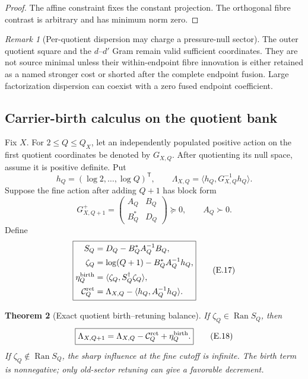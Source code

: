 \documentclass[11pt]{article}
\newtheorem{theorem}{Theorem}[section]
\theoremstyle{definition}
\theoremstyle{remark}
\newtheorem{remark}[theorem]{Remark}
\newcommand{\Ran}{\operatorname{Ran}}
\begin{document}
\begin{proof}
The affine constraint fixes the constant projection.  The orthogonal fibre
contrast is arbitrary and has minimum norm zero.
\end{proof}

\begin{remark}[Per-quotient dispersion may charge a pressure-null sector]
The outer quotient square and the $d$--$d'$ Gram remain valid sufficient
coordinates.  They are not source minimal unless their within-endpoint fibre
innovation is either retained as a named stronger cost or shorted after the
complete endpoint fusion.  Large factorization dispersion can coexist with a
zero fused endpoint coefficient.
\end{remark}

\subsection{Carrier-birth calculus on the quotient bank}
\label{subsec:affend-quotient-birth}

Fix $X$.  For $2\le Q\le Q_X$, let an independently populated positive action
on the first quotient coordinates be denoted by $G_{X,Q}$.  After quotienting
its null space, assume it is positive definite.  Put
\[
 h_Q=(\log2,\ldots,\log Q)^{\mathsf T},
 \qquad
 \Lambda_{X,Q}=\langle h_Q,G_{X,Q}^{-1}h_Q\rangle.
\]
Suppose the fine action after adding $Q+1$ has block form
\[
 G_{X,Q+1}^{+}
 =\begin{pmatrix}A_Q&B_Q\\B_Q^*&D_Q\end{pmatrix}\succeq0,
 \qquad A_Q\succ0.
\]
Define
\begin{equation}
 \label{eq:affend-birth-data}
 \boxed{
 \begin{aligned}
 S_Q&=D_Q-B_Q^*A_Q^{-1}B_Q,\\
 \zeta_Q&=\log(Q+1)-B_Q^*A_Q^{-1}h_Q,\\
 \eta_Q^{\rm birth}
 &=\langle\zeta_Q,S_Q^{\dagger}\zeta_Q\rangle,\\
 \mathcal C_Q^{\rm ret}
 &=\Lambda_{X,Q}-\langle h_Q,A_Q^{-1}h_Q\rangle.
 \end{aligned}}
 \tag{E.17}
\end{equation}

\begin{theorem}[Exact quotient birth--retuning balance]
\label{thm:affend-birth-retuning}
If $\zeta_Q\in\Ran S_Q$, then
\begin{equation}
 \label{eq:affend-birth-retuning}
 \boxed{
 \Lambda_{X,Q+1}
 =\Lambda_{X,Q}
  -\mathcal C_Q^{\rm ret}
  +\eta_Q^{\rm birth}.}
 \tag{E.18}
\end{equation}
If $\zeta_Q\notin\Ran S_Q$, the sharp influence at the fine cutoff is infinite.
The birth term is nonnegative; only old-sector retuning can give a favorable
decrement.
\end{theorem}
\end{document}
